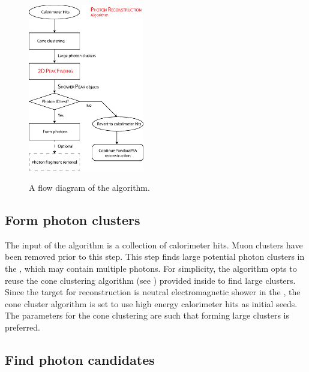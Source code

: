 \begin{figure}[tbph]
\centering
{\includegraphics[width=0.45\textwidth]{photon/photonRecoFlow}}
\caption[A flow diagram of the \PhotonReconstruction algorithm.]
{A flow diagram of the \PhotonReconstruction algorithm.}
\label{fig:photonPhotonRecoFlow}
\end{figure}


\subsection{Form photon clusters}

The input of the \PhotonReconstruction algorithm is a collection of calorimeter hits. Muon clusters have been removed prior to this step.  This step finds large potential photon clusters in the \ECAL, which may contain multiple photons. For simplicity, the algorithm opts to reuse  the cone clustering algorithm (see ) provided inside \pandora to find large clusters. Since the target for reconstruction is neutral electromagnetic shower in the \ECAL, the cone cluster algorithm is set to use high energy calorimeter hits as initial seeds.  The parameters for the cone clustering are such that  forming large clusters is preferred.

\subsection{Find photon candidates}
\label{sec:photonCandiate}


